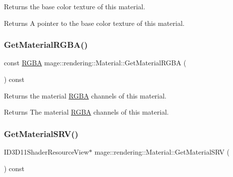 Returns the base color texture of this material.

\begin{DoxyReturn}{Returns}
A pointer to the base color texture of this material. 
\end{DoxyReturn}
\mbox{\label{classmage_1_1rendering_1_1_material_a0464566ef674bf074d0af22e852daaa3}} 
\subsubsection{\texorpdfstring{Get\+Material\+R\+G\+B\+A()}{GetMaterialRGBA()}}
{\footnotesize\ttfamily const \mbox{\hyperlink{structmage_1_1_r_g_b_a}{R\+G\+BA}} mage\+::rendering\+::\+Material\+::\+Get\+Material\+R\+G\+BA (\begin{DoxyParamCaption}{ }\end{DoxyParamCaption}) const\hspace{0.3cm}{\ttfamily [noexcept]}}

Returns the material \mbox{\hyperlink{structmage_1_1_r_g_b_a}{R\+G\+BA}} channels of this material.

\begin{DoxyReturn}{Returns}
The material \mbox{\hyperlink{structmage_1_1_r_g_b_a}{R\+G\+BA}} channels of this material. 
\end{DoxyReturn}
\mbox{\label{classmage_1_1rendering_1_1_material_ae1e1f712801dd1f16a695692df4f4f23}} 
\subsubsection{\texorpdfstring{Get\+Material\+S\+R\+V()}{GetMaterialSRV()}}
{\footnotesize\ttfamily I\+D3\+D11\+Shader\+Resource\+View$\ast$ mage\+::rendering\+::\+Material\+::\+Get\+Material\+S\+RV (\begin{DoxyParamCaption}{ }\end{DoxyParamCaption}) const\hspace{0.3cm}{\ttfamily [noexcept]}}

